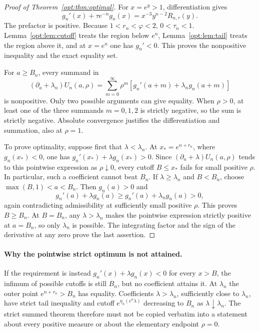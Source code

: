 \documentclass[11pt,a4paper]{article}
\theoremstyle{definition}
\theoremstyle{remark}
\numberwithin{equation}{section}
\begin{document}
\begin{proof}[Proof of Theorem~\ref{opt:thm:optimal}]
For $x=e^y>1$, differentiation gives
\begin{equation}\label{opt:eq:pointwise-factor}
 g_n'(x)+\tau e^{-n}g_n(x)
 =x^{-3}y^{n-2}R_{n,\tau}(y).
\end{equation}
The prefactor is positive. Because $1<r_n<\varphi<2$,
$0<\tau_n<1$. Lemma~\ref{opt:lem:cutoff} treats the region below
$e^n$, Lemma~\ref{opt:lem:tail} treats the region above it, and
at $x=e^n$ one has $g_n'<0$. This proves the nonpositive inequality
and the exact equality set.

For $a\geq B_n$, every summand in
\[
 (\partial_a+\lambda_n)U_n(a,\rho)
 =\sum_{m=0}^{\infty}\rho^m
       [g_n'(a+m)+\lambda_n g_n(a+m)]
\]
is nonpositive. Only two possible arguments can give equality.
When $\rho>0$, at least one of the three summands $m=0,1,2$ is
strictly negative, so the sum is strictly negative. Absolute convergence
justifies the differentiation and summation, also at $\rho=1$.

To prove optimality, suppose first that $\lambda<\lambda_n$.
At $x_*=e^{n+r_n}$, where $g_n(x_*)<0$, one has
$g_n'(x_*)+\lambda g_n(x_*)>0$. Since
$(\partial_a+\lambda)U_n(a,\rho)$ tends to this pointwise expression
as $\rho\downarrow0$, every cutoff $B\leq x_*$ fails for small
positive $\rho$. In particular, such a coefficient cannot beat $B_n$.
If $\lambda\geq\lambda_n$ and $B<B_n$, choose
$\max(B,1)<a<B_n$. Then $g_n(a)>0$ and
\[
 g_n'(a)+\lambda g_n(a)
 \geq g_n'(a)+\lambda_n g_n(a)>0,
\]
again contradicting admissibility at sufficiently small positive $\rho$.
This proves $B\geq B_n$. At $B=B_n$, any $\lambda>\lambda_n$
makes the pointwise expression strictly positive at $a=B_n$,
so only $\lambda_n$ is possible. The integrating factor and the sign
of the derivative at any zero prove the last assertion.
\end{proof}

\paragraph{Why the pointwise strict optimum is not attained.}
If the requirement is instead
$g_n'(x)+\lambda g_n(x)<0$ for every $x>B$, the infimum of possible
cutoffs is still $B_n$, but no coefficient attains it. At
$\lambda_n$ the outer point $e^{n+r_n}>B_n$ has equality.
Coefficients $\lambda>\lambda_n$, sufficiently close to $\lambda_n$,
have strict tail inequality and cutoff $e^{\eta_n(e^n\lambda)}$
decreasing to $B_n$ as $\lambda\downarrow\lambda_n$.
The strict summed theorem therefore must not be copied verbatim into
a statement about every positive measure or about the elementary
endpoint $\rho=0$.
\end{document}
